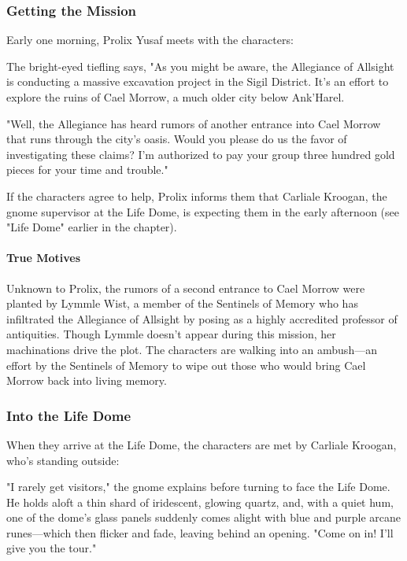 \documentclass[10pt,a4paper,twoside,twocolumn,openany,nodeprecatedcode]{dndbook}
\begin{document}
\subsubsection{Getting the Mission}
Early one morning, Prolix Yusaf meets with the characters:

\begin{DndReadAloud}{}
The bright-eyed tiefling says, "As you might be aware, the Allegiance of Allsight is conducting a massive excavation project in the Sigil District. It's an effort to explore the ruins of Cael Morrow, a much older city below Ank'Harel.

"Well, the Allegiance has heard rumors of another entrance into Cael Morrow that runs through the city's oasis. Would you please do us the favor of investigating these claims? I'm authorized to pay your group three hundred gold pieces for your time and trouble."

\end{DndReadAloud}

If the characters agree to help, Prolix informs them that Carliale Kroogan, the gnome supervisor at the Life Dome, is expecting them in the early afternoon (see "Life Dome" earlier in the chapter).

\paragraph{True Motives}
Unknown to Prolix, the rumors of a second entrance to Cael Morrow were planted by Lymmle Wist, a member of the Sentinels of Memory who has infiltrated the Allegiance of Allsight by posing as a highly accredited professor of antiquities. Though Lymmle doesn't appear during this mission, her machinations drive the plot. The characters are walking into an ambush—an effort by the Sentinels of Memory to wipe out those who would bring Cael Morrow back into living memory.

\subsubsection{Into the Life Dome}
When they arrive at the Life Dome, the characters are met by Carliale Kroogan, who's standing outside:

\begin{DndReadAloud}{}
"I rarely get visitors," the gnome explains before turning to face the Life Dome. He holds aloft a thin shard of iridescent, glowing quartz, and, with a quiet hum, one of the dome's glass panels suddenly comes alight with blue and purple arcane runes—which then flicker and fade, leaving behind an opening. "Come on in! I'll give you the tour."

\end{DndReadAloud}
\end{document}

